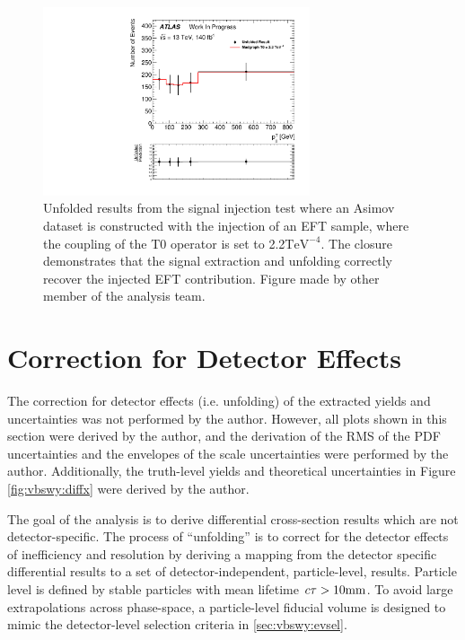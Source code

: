 \begin{figure}[t]
  \centering
  \includegraphics[width=0.7\textwidth]{plots/diffx/siginjection_T0_2.2.pdf}
  \caption{Unfolded results from the signal injection test where an Asimov dataset is constructed with the injection of an EFT sample, where the coupling of the T0 operator is set to 2.2$\text{TeV}^{-4}$. The closure demonstrates that the signal extraction and unfolding correctly recover the injected EFT contribution. Figure made by other member of the analysis team.\label{fig:vbswy:siginj}}
\end{figure}

\section{Correction for Detector Effects}\label{sec:vbswy:unfolding}

The correction for detector effects (i.e. unfolding) of the extracted \ewwy yields and uncertainties was not performed by the author. However, all plots shown in this section were derived by the author, and the derivation of the RMS of the PDF uncertainties and the envelopes of the scale uncertainties were performed by the author. Additionally, the truth-level yields and theoretical uncertainties in Figure \ref{fig:vbswy:diffx} were derived by the author.

The goal of the analysis is to derive differential cross-section results which are not detector-specific. The process of ``unfolding'' is to correct for the detector effects of inefficiency and resolution by deriving a mapping from the detector specific differential results to a set of detector-independent, particle-level, results. Particle level is defined by stable particles with mean lifetime $c\tau>10\text{mm}$. To avoid large extrapolations across phase-space, a particle-level fiducial volume is designed to mimic the detector-level selection criteria in \ref{sec:vbswy:evsel}.


